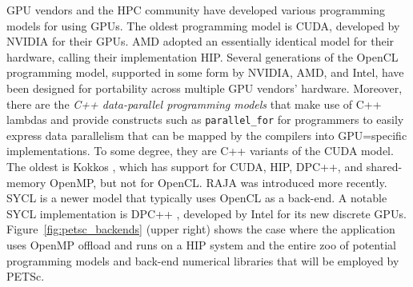 \documentclass[10pt,journal,compsoc]{IEEEtran}
\begin{document}
GPU vendors and the HPC
community have developed various programming models
for using GPUs. The oldest %
programming model is CUDA, developed by NVIDIA for their GPUs. AMD adopted
an essentially identical model for their hardware, calling their implementation
HIP. Several generations of the OpenCL programming
model, supported in some form by NVIDIA, AMD, and Intel,
have been designed for portability across multiple GPU vendors' hardware.
Moreover, there are the
\emph{C++ data\hyp{}parallel programming models} that make use of C++
lambdas and provide constructs such as {\tt parallel\_for} for programmers to
easily express data parallelism that can be mapped by the compilers into GPU=specific implementations. To some degree, they are C++
variants of the CUDA model. The oldest is Kokkos \cite{KOKKOS}, which has support for
CUDA, HIP, DPC++, and shared-memory OpenMP, but not for OpenCL.  RAJA \cite{RAJA} was introduced
more recently. SYCL \cite{SYCL} is a newer model that typically uses OpenCL as
a back-end. A notable SYCL implementation is DPC++ \cite{DPC++}, developed
by Intel for its new discrete GPUs.
Figure~\ref{fig:petsc_backends} (upper right) shows the case where the application
uses OpenMP offload and runs on a HIP system and
the entire zoo of potential programming models and back-end numerical
libraries that will be employed by PETSc.

\end{document}
